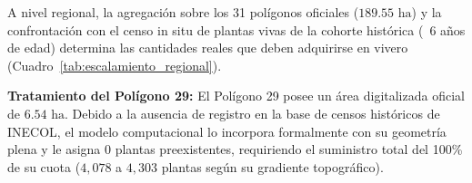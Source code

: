 \documentclass[11pt,a4paper]{article}
\begin{document}
A nivel regional, la agregación sobre los 31 polígonos oficiales ($189.55\text{ ha}$) y la confrontación con el censo in situ de plantas vivas de la cohorte histórica (~6 años de edad) determina las cantidades reales que deben adquirirse en vivero (Cuadro~\ref{tab:escalamiento_regional}).

\begin{table}[H]
\centering
\small
\caption{Consolidación regional de plantas en los 31 polígonos oficiales ($189.55\text{ ha}$).}\label{tab:escalamiento_regional}
\end{table}

\textbf{Tratamiento del Polígono 29:} El Polígono 29 posee un área digitalizada oficial de $6.54\text{ ha}$. Debido a la ausencia de registro en la base de censos históricos de INECOL, el modelo computacional lo incorpora formalmente con su geometría plena y le asigna $0$ plantas preexistentes, requiriendo el suministro total del 100\% de su cuota ($4,078$ a $4,303$ plantas según su gradiente topográfico).
\end{document}
